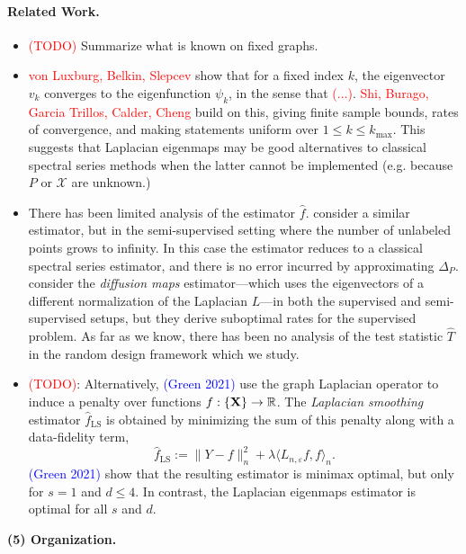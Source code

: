 \documentclass{article}
\newcommand{\Reals}{\mathbb{R}}
\newcommand{\1}{\mathbf{1}}
\newcommand{\mc}[1]{\mathcal{#1}}
\newcommand{\dotp}[2]{\langle #1, #2 \rangle}
\newcommand{\wh}[1]{\widehat{#1}}
\theoremstyle{alden}
\theoremstyle{aldenthm}
\theoremstyle{definition}
\theoremstyle{remark}
\begin{document}
\paragraph{Related Work.} 
\begin{itemize}
	\item \textcolor{red}{(TODO)} Summarize what is known on fixed graphs.
	\item \textcolor{red}{von Luxburg, Belkin, Slepcev} show that for a fixed index $k$, the eigenvector $v_k$ converges to the eigenfunction $\psi_k$, in the sense that \textcolor{red}{(...)}. \textcolor{red}{Shi, Burago, Garcia Trillos, Calder, Cheng} build on this, giving finite sample bounds, rates of convergence, and making statements uniform over $1 \leq k \leq k_{\max}$. This suggests that Laplacian eigenmaps may be good alternatives to classical spectral series methods when the latter cannot be implemented (e.g. because $P$ or $\mc{X}$ are unknown.) 
	\item There has been limited analysis of the estimator $\wh{f}$. \cite{zhou2011} consider a similar estimator, but in the semi-supervised setting where the number of unlabeled points grows to infinity. In this case the estimator reduces to a classical spectral series estimator, and there is no error incurred by approximating $\Delta_P$. \cite{lee2016} consider the \emph{diffusion maps} estimator---which uses the eigenvectors of a different normalization of the Laplacian $L$---in both the supervised and semi-supervised setups, but they derive suboptimal rates for the supervised problem. As far as we know, there has been no analysis of the test statistic $\wh{T}$ in the random design framework which we study.
	\item \textcolor{red}{(TODO)}: Alternatively, \cite{trillos2020} \textcolor{blue}{(Green 2021)} use the graph Laplacian operator to induce a penalty over functions $f: \{\bf X\} \to \Reals$. The \emph{Laplacian smoothing} estimator $\wh{f}_{\mathrm{LS}}$ is obtained by minimizing the sum of this penalty along with a data-fidelity term,
	\begin{equation*}
	\wh{f}_{\mathrm{LS}} := \|Y - f\|_n^2 + \lambda \dotp{L_{n,\varepsilon}f}{f}_n.
	\end{equation*}
	\textcolor{blue}{(Green 2021)} show that the resulting estimator is minimax optimal, but only for $s = 1$ and $d \leq 4$. In contrast, the Laplacian eigenmaps estimator is optimal for all $s$ and $d$. 
\end{itemize}

\textbf{(5) Organization.}
\end{document}
